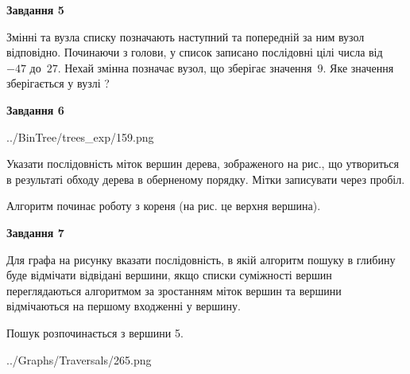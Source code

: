 \documentclass[12pt, ukrainian]{article}
\begin{document}
{\begin {large}
{\begin {center}\textbf{Завдання 5}\end {center}}\par
Змінні  та  вузла списку позначають наступний та попередній за ним вузол відповідно. Починаючи з голови, у список записано послідовні цілі числа від~$-47$ до~$27$. Нехай змінна  позначає вузол, що зберігає значення~$9$.
Яке значення зберігається у вузлі  ?\par
\newpage

{\begin {center}\textbf{Завдання 6}\end {center}}\par

\begin{center}
	{../BinTree/trees_exp/159.png}
\end{center}
Указати послідовність міток вершин дерева, зображеного на рис., що утвориться в результаті обходу дерева в оберненому порядку. Мітки записувати через пробіл.\par Алгоритм починає роботу з кореня (на рис. це верхня вершина).\par
\newpage

{\begin {center}\textbf{Завдання 7}\end {center}}\par
Для графа на рисунку вказати послідовність, в якій алгоритм пошуку в глибину буде відмічати відвідані вершини, якщо списки суміжності вершин переглядаються алгоритмом за зростанням міток вершин та вершини відмічаються на першому вход\-женні у вершину.\par
Пошук розпочинається з вершини 5.\par

\begin{center}
	{../Graphs/Traversals/265.png}
\end{center}\par
\newpage


\end{large}}
\end{document}
